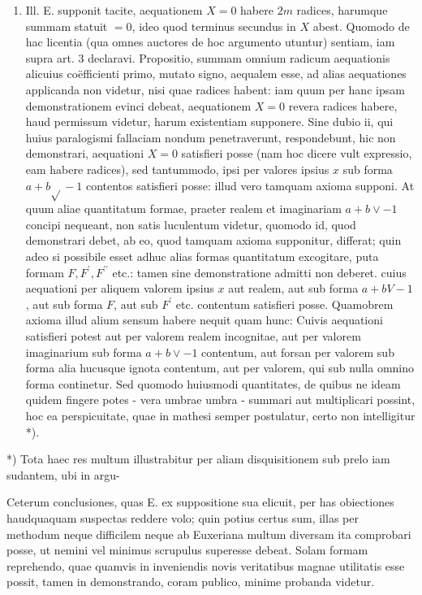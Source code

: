 \documentclass[twoside,12pt, showframe]{memoir}
\begin{document}
\begin{enumerate}
  \item Ill. E. supponit tacite, aequationem \(X=0\) habere \(2 m\) radices, harumque summam statuit \(=0\), ideo quod terminus secundus in \(X\) abest. Quomodo de hac licentia (qua omnes auctores de hoc argumento utuntur) sentiam, iam supra art. 3 declaravi. Propositio, summam omnium radicum aequationis alicuius coëfficienti primo, mutato signo, aequalem esse, ad alias aequationes applicanda non videtur, nisi quae radices habent: iam quum per hanc ipsam demonstrationem evinci debeat, aequationem \(X=0\) revera radices habere, haud permissum videtur, harum existentiam supponere. Sine dubio ii, qui huius paralogismi fallaciam nondum penetraverunt, respondebunt, hic non demonstrari, aequationi \(X=0\) satisfieri posse (nam hoc dicere vult expressio, eam habere radices), sed tantummodo, ipsi per valores ipsius \(x\) sub forma \(a+b \sqrt{ }-1\) contentos satisfieri posse: illud vero tamquam axioma supponi. At quum aliae quantitatum formae, praeter realem et imaginariam \(a+b \vee-1\) concipi nequeant, non satis luculentum videtur, quomodo id, quod demonstrari debet, ab eo, quod tamquam axioma supponitur, differat; quin adeo si possibile esset adhuc alias formas quantitatum excogitare, puta formam \(F, F^{\prime}, F^{\prime \prime}\) etc.: tamen sine demonstratione admitti non deberet. cuius aequationi per aliquem valorem ipsius \(x\) aut realem, aut sub forma \(a+b V-1\), aut sub forma \(F\), aut sub \(F^{\prime}\) etc. contentum satisfieri posse. Quamobrem axioma illud alium sensum habere nequit quam hunc: Cuivis aequationi satisfieri potest aut per valorem realem incognitae, aut per valorem imaginarium sub forma \(a+b \vee-1\) contentum, aut forsan per valorem sub forma alia hucusque ignota contentum, aut per valorem, qui sub nulla omnino forma continetur. Sed quomodo huiusmodi quantitates, de quibus ne ideam quidem fingere potes - vera umbrae umbra - summari aut multiplicari possint, hoc ea perspicuitate, quae in mathesi semper postulatur, certo non intelligitur *).

\end{enumerate}

*) Tota haec res multum illustrabitur per aliam disquisitionem sub prelo iam sudantem, ubi in argu-

Ceterum conclusiones, quas E. ex suppositione sua elicuit, per has obiectiones haudquaquam suspectas reddere volo; quin potius certus sum, illas per methodum neque difficilem neque ab Euxeriana multum diversam ita comprobari posse, ut nemini vel minimus scrupulus superesse debeat. Solam formam reprehendo, quae quamvis in inveniendis novis veritatibus magnae utilitatis esse possit, tamen in demonstrando, coram publico, minime probanda videtur.
\end{document}
